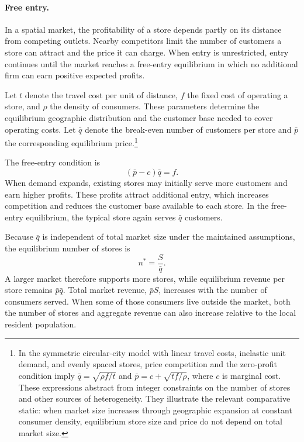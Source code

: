 \documentclass[english,12pt]{article}
\begin{document}
\paragraph{Free entry.}
In a spatial market, the profitability of a store depends partly on its distance from competing outlets. Nearby competitors limit the number of customers a store can attract and the price it can charge. When entry is unrestricted, entry continues until the market reaches a free-entry equilibrium in which no additional firm can earn positive expected profits.

Let $t$ denote the travel cost per unit of distance, $f$ the fixed cost of operating a store, and $\rho$ the density of consumers. These parameters determine the equilibrium geographic distribution and the customer base needed to cover operating costs. Let $\bar q$ denote the break-even number of customers per store and $\bar p$ the corresponding equilibrium price.\footnote{In the symmetric circular-city model with linear travel costs, inelastic unit demand, and evenly spaced stores, price competition and the zero-profit condition imply $\bar q=\sqrt{\rho f/t}$ and $\bar p=c+\sqrt{tf/\rho}$, where $c$ is marginal cost. These expressions abstract from integer constraints on the number of stores and other sources of heterogeneity. They illustrate the relevant comparative static: when market size increases through geographic expansion at constant consumer density, equilibrium store size and price do not depend on total market size.}

The free-entry condition is
\begin{equation}
\label{eq:zeroprofit}
(\bar p-c)\bar q=f.
\end{equation}
When demand expands, existing stores may initially serve more customers and earn higher profits. These profits attract additional entry, which increases competition and reduces the customer base available to each store. In the free-entry equilibrium, the typical store again serves $\bar q$ customers.

Because $\bar q$ is independent of total market size under the maintained assumptions, the equilibrium number of stores is
\begin{equation}
\label{eq:nstar}
n^\ast=\frac{S}{\bar q}.
\end{equation}
A larger market therefore supports more stores, while equilibrium revenue per store remains $\bar p\bar q$. Total market revenue, $\bar p S$, increases with the number of consumers served. When some of those consumers live outside the market, both the number of stores and aggregate revenue can also increase relative to the local resident population.
\end{document}
